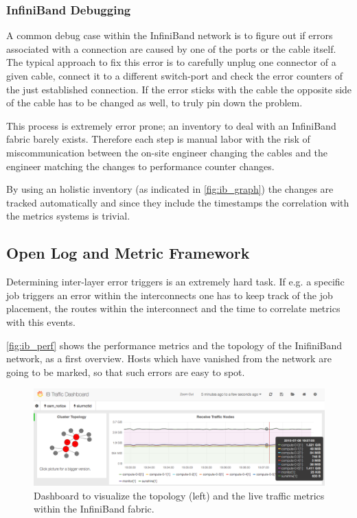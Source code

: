 \subsubsection{InfiniBand Debugging}
A common debug case within the InfiniBand network is to figure out if errors associated with a connection are caused by one of the ports or the cable itself.
The typical approach to fix this error is to carefully unplug one connector of a given cable, connect it to a different switch-port and check the error counters of the just established connection.
If the error sticks with the cable the opposite side of the cable has to be changed as well, to truly pin down the problem.

This process is extremely error prone; an inventory to deal with an InfiniBand fabric barely exists. Therefore each step is manual labor with the risk of miscommunication between the on-site engineer changing the
cables and the engineer matching the changes to performance counter changes.

By using an holistic inventory (as indicated in \autoref{fig:ib_graph}) the changes are tracked automatically and since they include the timestamps the correlation with the metrics systems is trivial.

\subsection{Open Log and Metric Framework}
Determining inter-layer error triggers is an extremely hard task. If e.g. a specific job triggers an error within the interconnects one has to keep track of the job placement, the routes within the interconnect and
the time to correlate metrics with this events.

\autoref{fig:ib_perf} shows the performance metrics and the topology of the InifiniBand network,
as a first overview. Hosts which have vanished from the network are going to be marked, so that such errors are easy to spot.

\begin{figure}[!ht]
    \includegraphics[width=.4\textwidth]{images/png/ib_perf_s.png}
    \caption{\label{fig:ib_perf}Dashboard to visualize the topology (left) and the live traffic metrics within the InfiniBand fabric.}
\end{figure}

